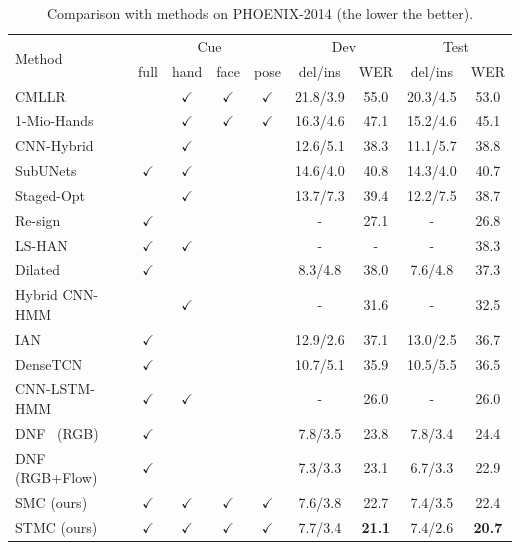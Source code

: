 \documentclass[letterpaper]{article} %
\def\gou{{$\checkmark$}}
\begin{document}
\begin{table}[tp]
    \centering
    \small
    \caption{Comparison with methods on PHOENIX-2014 (the lower the better).} \label{tab:phoenix2014}
    \begin{tabular*}{0.90\textwidth}{p{6.5cm}@{\extracolsep{\fill}}|cccc|cc|cc}
    \hline
    \multirow{2}{*}{Method}         &\multicolumn{4}{c|}{Cue}        & \multicolumn{2}{c|}{Dev} & \multicolumn{2}{c}{Test} \\
                                    & full & hand & face   & pose  & del/ins  & WER  & del/ins      & WER                  \\ \hline
    CMLLR~\cite{phoenixdataset2014} &      & \gou & \gou   & \gou  & 21.8/3.9 & 55.0 & 20.3/4.5 & 53.0      \\
    1-Mio-Hands~\cite{deephand}     &      & \gou & \gou   & \gou  & 16.3/4.6 & 47.1 & 15.2/4.6 & 45.1      \\
    CNN-Hybrid~\cite{deepsign}      &      & \gou &        &       & 12.6/5.1 & 38.3 & 11.1/5.7 & 38.8      \\
    SubUNets~\cite{subunet}         & \gou & \gou &        &       & 14.6/4.0 & 40.8 & 14.3/4.0 & 40.7      \\
    Staged-Opt~\cite{staged}        &      & \gou &        &       & 13.7/7.3 & 39.4 & 12.2/7.5 & 38.7      \\
    Re-sign~\cite{resign}           & \gou &      &        &       & -        & 27.1 & -        & 26.8      \\
    LS-HAN~\cite{han}               & \gou & \gou &        &       & -        & -    & -        & 38.3      \\
    Dilated~\cite{dilated}          & \gou &      &        &       & 8.3/4.8  & 38.0 & 7.6/4.8  & 37.3      \\
    Hybrid CNN-HMM~\cite{koller2018ijcv} &  &\gou  &       &       & -       & 31.6 & -        & 32.5      \\
    IAN~\cite{ian}                  & \gou &      &        &       & 12.9/2.6 & 37.1 & 13.0/2.5 & 36.7      \\
    DenseTCN~\cite{densetcn}        & \gou &      &        &       & 10.7/5.1 & 35.9 & 10.5/5.5 & 36.5      \\
    CNN-LSTM-HMM~\cite{tpami19}     & \gou & \gou &        &       & -        & 26.0 & -        & 26.0      \\
    DNF~\cite{cui-tmm19} (RGB)        & \gou &      &      &       & 7.8/3.5  & 23.8 & 7.8/3.4  & 24.4      \\
    DNF~\cite{cui-tmm19} (RGB+Flow)   & \gou &      &      &       & 7.3/3.3  & 23.1 & 6.7/3.3  & 22.9      \\ \hline
    SMC  (ours)                     & \gou & \gou & \gou   &\gou   & 7.6/3.8  & 22.7 & 7.4/3.5  & 22.4      \\
    STMC (ours)                     & \gou & \gou & \gou   &\gou   & 7.7/3.4  & \textbf{21.1} & 7.4/2.6  & \textbf{20.7}      \\ \hline

    \end{tabular*}
\end{table}
\end{document}
